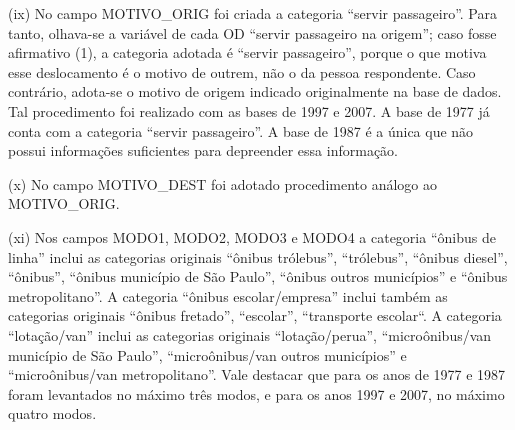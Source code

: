 \begin{compactitem}[]
\item(ix) No campo MOTIVO_ORIG foi criada a categoria ``servir passageiro''. Para tanto, olhava-se a variável de cada OD ``servir passageiro na origem''; caso fosse afirmativo (1), a categoria adotada é ``servir passageiro'', porque o que motiva esse deslocamento é o motivo de outrem, não o da pessoa respondente. Caso contrário, adota-se o motivo de origem indicado originalmente na base de dados. Tal procedimento foi realizado com as bases de 1997 e 2007. A base de 1977 já conta com a categoria ``servir passageiro''. A base de 1987 é a única que não possui informações suficientes para depreender essa informação.
\item(x) No campo MOTIVO_DEST foi adotado procedimento análogo ao MOTIVO_ORIG.
\item (xi) Nos campos MODO1, MODO2, MODO3 e MODO4 a categoria ``ônibus de linha'' inclui as categorias originais ``ônibus trólebus'', ``trólebus'', ``ônibus diesel'', ``ônibus'', ``ônibus município de São Paulo'', ``ônibus outros municípios'' e ``ônibus metropolitano''. A categoria ``ônibus escolar/empresa'' inclui também as categorias originais ``ônibus fretado'', ``escolar'', ``transporte escolar``. A categoria ``lotação/van'' inclui as categorias originais ``lotação/perua'', ``microônibus/van município de São Paulo'', ``microônibus/van outros municípios'' e ``microônibus/van metropolitano''. Vale destacar que para os anos de 1977 e 1987 foram levantados no máximo três modos, e para os anos 1997 e 2007, no máximo quatro modos.
\end{compactitem}

\clearpage
\newcommand{\layoutTamColA}{0.50cm}
\newcommand{\layoutTamColB}{3.20cm}
\newcommand{\layoutTamColC}{4.20cm}
\newcommand{\layoutTamColD}{0.90cm}
\newcommand{\layoutTamColE}{4.50cm}
\newcommand{\layoutColA}[2]{%
	\multicolumn{1}{|c|}{\multirow{#1}{\layoutTamColA}{\centering#2}}%
}
\newcommand{\layoutColB}[2]{\multicolumn{1}{c|}{\multirow{#1}{\layoutTamColB}{\centering#2}}}
\newcommand{\layoutColC}[2]{\multicolumn{1}{c|}{\multirow{#1}{\layoutTamColC}{\centering#2}}}
\newcommand{\layoutColD}[2]{\multicolumn{1}{c|}{\multirow{#1}{\layoutTamColD}{\centering#2}}}

